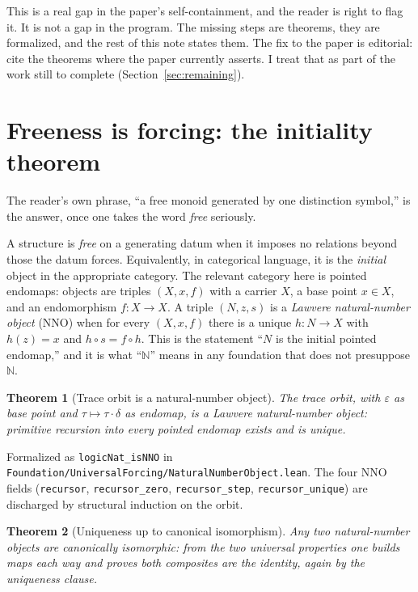 \documentclass[11pt,a4paper]{article}
\newtheorem{theorem}{Theorem}[section]
\theoremstyle{definition}
\theoremstyle{remark}
\newcommand{\code}[1]{\texttt{\small #1}}
\begin{document}
This is a real gap in the paper's self-containment, and the reader is right to
flag it. It is not a gap in the program. The missing steps are theorems, they
are formalized, and the rest of this note states them. The fix to the paper is
editorial: cite the theorems where the paper currently asserts. I treat that as
part of the work still to complete (Section~\ref{sec:remaining}).

\section{Freeness is forcing: the initiality theorem}\label{sec:initial}

The reader's own phrase, ``a free monoid generated by one distinction symbol,''
is the answer, once one takes the word \emph{free} seriously.

A structure is \emph{free} on a generating datum when it imposes no relations
beyond those the datum forces. Equivalently, in categorical language, it is the
\emph{initial} object in the appropriate category. The relevant category here is
pointed endomaps: objects are triples $(X, x, f)$ with a carrier $X$, a base
point $x \in X$, and an endomorphism $f : X \to X$. A triple $(N, z, s)$ is a
\emph{Lawvere natural-number object} (NNO) when for every $(X, x, f)$ there is a
unique $h : N \to X$ with $h(z) = x$ and $h \circ s = f \circ h$. This is the
statement ``$N$ is the initial pointed endomap,'' and it is what ``$\mathbb{N}$''
means in any foundation that does not presuppose $\mathbb{N}$.

\begin{theorem}[Trace orbit is a natural-number object]\label{thm:nno}
The trace orbit, with $\varepsilon$ as base point and $\tau \mapsto \tau\cdot\delta$
as endomap, is a Lawvere natural-number object: primitive recursion into every
pointed endomap exists and is unique.
\end{theorem}

Formalized as \code{logicNat\_isNNO} in
\code{Foundation/UniversalForcing/NaturalNumberObject.lean}. The four NNO fields
(\code{recursor}, \code{recursor\_zero}, \code{recursor\_step},
\code{recursor\_unique}) are discharged by structural induction on the orbit.

\begin{theorem}[Uniqueness up to canonical isomorphism]\label{thm:nno-unique}
Any two natural-number objects are canonically isomorphic: from the two
universal properties one builds maps each way and proves both composites are the
identity, again by the uniqueness clause.
\end{theorem}
\end{document}
